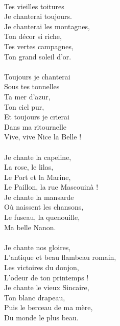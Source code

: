 {\\Tes vieilles toitures
\\Je chanterai toujours.
\\Je chanterai les montagnes,
\\Ton décor si riche,
\\Tes vertes campagnes,
\\Ton grand soleil d’or.
\\\\Toujours je chanterai
\\Sous tes tonnelles
\\Ta mer d’azur,
\\Ton ciel pur,
\\Et toujours je crierai
\\Dans ma ritournelle
\\Vive, vive Nice la Belle !
\\\\Je chante la capeline,
\\La rose, le lilas,
\\Le Port et la Marine,
\\Le Paillon, la rue Mascouinà !
\\Je chante la mansarde
\\Où naissent les chansons,
\\Le fuseau, la quenouille,
\\Ma belle Nanon.
\\\\Je chante nos gloires,
\\L’antique et beau flambeau romain,
\\Les victoires du donjon,
\\L’odeur de ton printemps !
\\Je chante le vieux Sincaire,
\\Ton blanc drapeau,
\\Puis le berceau de ma mère,
\\Du monde le plus beau.
}
\breakpage